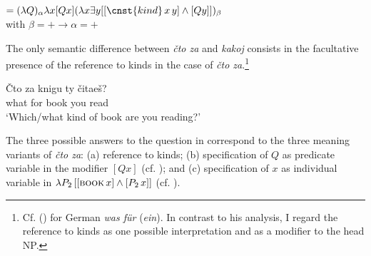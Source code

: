\documentclass[output=paper,colorlinks,citecolor=brown]{langscibook}
\begin{document}
\ea \label{ex:zi08:44}
     $= (\lambda Q)_\alpha \lambda x [Q x](\lambda x \exists y [[\cnst{kind}\, x\, y] \wedge [Q y]])_\beta$\\
    with $\beta = + \rightarrow \alpha = +$\\
	\z
\z

\noindent The only semantic difference between \textit{čto za} and \textit{kakoj} consists in the facultative presence of the reference to kinds in the case of \textit{čto za}.\footnote{\label{fn:zi08:6}Cf. \citeauthor{Pafel1991} (\citeyear{Pafel1991,Pafel1996b,Pafel1996a}) for German \textit{was für} (\textit{ein}). In contrast to his analysis, I regard the reference to kinds as one possible interpretation and as a modifier to the head NP.}

\ea \label{ex:zi08:45}
    \gll Čto za knigu ty čitaeš?\\
         what for book you read\\
    \glt `Which/what kind of book are you reading?'
	\z
\z

\noindent The three possible answers to the question in  correspond to the three meaning variants of \textit{čto za}: (a) reference to kinds; (b) specification of $Q$ as predicate variable in the modifier $[Q x]$ (cf. ); and (c) specification of $x$ as individual variable in $\lambda P_2 \,[[\textsc{book}\, x] \wedge [P_2 \, x]]$ (cf. ).
\end{document}
